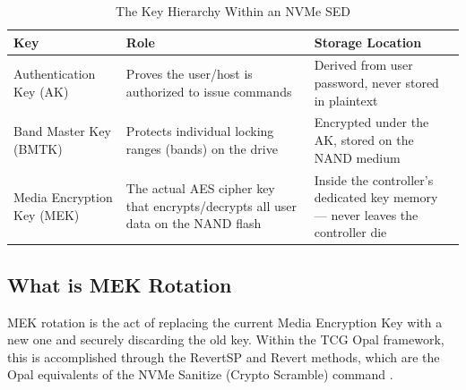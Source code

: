 \begin{table}[htbp]
    \centering
    \caption{The Key Hierarchy Within an NVMe SED}
    \label{tab:opal-keys}
    \begin{tabularx}{\textwidth}{lXX}
        \toprule
        \textbf{Key} & \textbf{Role} & \textbf{Storage Location} \\
        \midrule
        Authentication Key (AK) & Proves the user/host is authorized to issue commands & Derived from user password, never stored in plaintext \\
        \midrule
        Band Master Key (BMTK) & Protects individual locking ranges (bands) on the drive & Encrypted under the AK, stored on the NAND medium \\
        \midrule
        Media Encryption Key (MEK) & The actual AES cipher key that encrypts/decrypts all user data on the NAND flash & Inside the controller's dedicated key memory — never leaves the controller die \\
        \bottomrule
    \end{tabularx}
\end{table}

\subsection{What is MEK Rotation}

MEK rotation is the act of replacing the current Media Encryption Key with a new one and securely 
discarding the old key. Within the TCG Opal framework, this is accomplished through the RevertSP and 
Revert methods, which are the Opal equivalents of the NVMe Sanitize (Crypto Scramble) command \cite{aronsson2025secure}.


